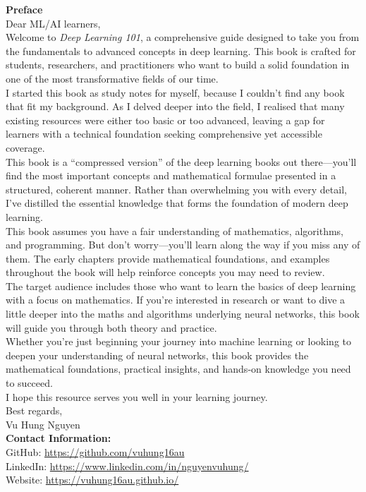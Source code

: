 \documentclass[10pt,\papersize,twoside,openright]{book}
\theoremstyle{definition}
\theoremstyle{remark}
\begin{document}
\begin{flushleft}
\textbf{Preface}\\[1em]

Dear ML/AI learners,\\[0.5em]

Welcome to \textit{Deep Learning 101}, a comprehensive guide designed to take you from the fundamentals to advanced concepts in deep learning. This book is crafted for students, researchers, and practitioners who want to build a solid foundation in one of the most transformative fields of our time.\\[0.5em]

I started this book as study notes for myself, because I couldn't find any book that fit my background. As I delved deeper into the field, I realised that many existing resources were either too basic or too advanced, leaving a gap for learners with a technical foundation seeking comprehensive yet accessible coverage.\\[0.5em]

This book is a ``compressed version'' of the deep learning books out there---you'll find the most important concepts and mathematical formulae presented in a structured, coherent manner. Rather than overwhelming you with every detail, I've distilled the essential knowledge that forms the foundation of modern deep learning.\\[0.5em]

This book assumes you have a fair understanding of mathematics, algorithms, and programming. But don't worry---you'll learn along the way if you miss any of them. The early chapters provide mathematical foundations, and examples throughout the book will help reinforce concepts you may need to review.\\[0.5em]

The target audience includes those who want to learn the basics of deep learning with a focus on mathematics. If you're interested in research or want to dive a little deeper into the maths and algorithms underlying neural networks, this book will guide you through both theory and practice.\\[0.5em]

Whether you're just beginning your journey into machine learning or looking to deepen your understanding of neural networks, this book provides the mathematical foundations, practical insights, and hands-on knowledge you need to succeed.\\[0.5em]

I hope this resource serves you well in your learning journey.\\[1em]

Best regards,\\
Vu Hung Nguyen\\[1em]

\textbf{Contact Information:}\\
GitHub: \url{https://github.com/vuhung16au}\\
LinkedIn: \url{https://www.linkedin.com/in/nguyenvuhung/}\\
Website: \url{https://vuhung16au.github.io/}
\end{flushleft}
\vspace*{\fill}
\clearpage
\end{document}
